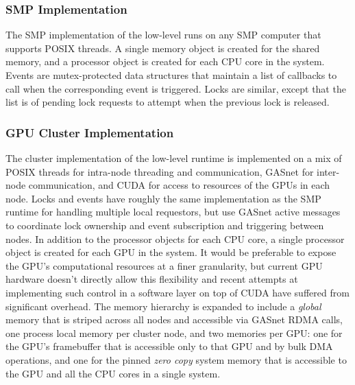 

\subsubsection{SMP Implementation}
\label{subsec:smpimpl}
The SMP implementation of the low-level runs on any SMP computer that supports 
POSIX threads.  A single memory object is created for the shared memory, and 
a processor object is created for
each CPU core in the system.  Events are 
mutex-protected data structures that maintain a list of callbacks to call when
the corresponding event is triggered.  Locks are similar, except that the list
is of pending lock requests to attempt when the previous lock is released.

\subsubsection{GPU Cluster Implementation}
\label{subsec:clusterimpl}
The cluster implementation of the low-level runtime is implemented on a mix
of POSIX threads for intra-node threading and communication, GASnet for 
inter-node communication, and CUDA for access to resources of the GPUs in 
each node.  Locks and events have roughly the same implementation as the SMP
runtime for handling multiple local requestors, but use GASnet active messages
to coordinate lock ownership and event subscription and triggering between
nodes.  In addition to the processor objects for each CPU core, a single
processor object is created for each GPU in the system.  It would be preferable
to expose the GPU's computational resources at a finer granularity, but
current GPU hardware doesn't directly allow this flexibility and recent attempts
at implementing such control in a software layer on top of CUDA have suffered
from significant overhead.  The memory hierarchy is expanded to include a 
{\em global} memory that is striped across all nodes and accessible via GASnet
RDMA calls, one process local memory per cluster node, and two memories per GPU: one for the GPU's framebuffer that is
accessible only to that GPU and by bulk DMA operations, and one for the pinned
{\em zero copy} system memory that is accessible to the GPU and all the CPU cores
in a single system.
